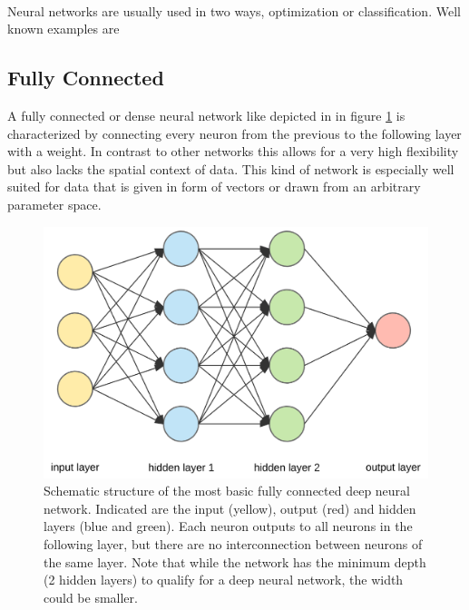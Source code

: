 		~\\
		Neural networks are usually used in two ways, optimization or classification. Well known examples are 
		\subsection{Fully Connected}
			\label{NNFully}
			A fully connected or dense neural network like depicted in in figure \ref{Img_NNFully} is characterized by connecting every neuron from the previous to the following layer with a weight. In contrast to other networks this allows for a very high flexibility but also lacks the spatial context of data. This kind of network is especially well suited for data that is given in form of vectors or drawn from an arbitrary parameter space.%
			
			
			\begin{figure}
				\includegraphics[width=\textwidth]{images/simpleNN.png}
				\caption{Schematic structure of the most basic fully connected deep neural network. Indicated are the input (yellow), output (red) and hidden layers (blue and green). Each neuron outputs to all neurons in the following layer, but there are no interconnection between neurons of the same layer. Note that while the network has the minimum depth (2 hidden layers) to qualify for a deep neural network, the width  could be smaller.}
				\label{Img_NNFully}
			\end{figure}

